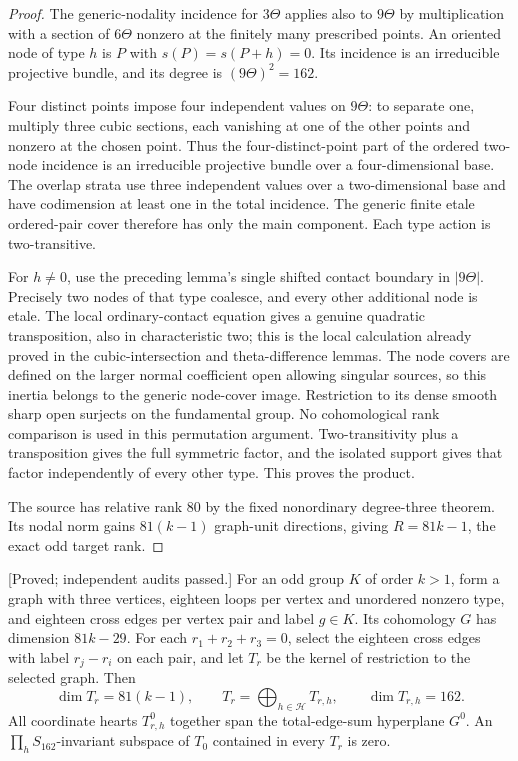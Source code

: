\begin{proof}
The generic-nodality incidence for $3\Theta$ applies also to
$9\Theta$ by multiplication with a section of $6\Theta$ nonzero
at the finitely many prescribed points. An oriented node of type
$h$ is $P$ with $s(P)=s(P+h)=0$. Its incidence is an irreducible
projective bundle, and its degree is $(9\Theta)^2=162$.

Four distinct points impose four independent values on $9\Theta$:
to separate one, multiply three cubic sections, each vanishing
at one of the other points and nonzero at the chosen point.
Thus the four-distinct-point part of the ordered two-node
incidence is an irreducible projective bundle over a four-dimensional
base. The overlap strata use three independent values over a
two-dimensional base and have codimension at least one in the
total incidence. The generic finite etale ordered-pair cover
therefore has only the main component. Each type action is
two-transitive.

For $h\ne0$, use the preceding lemma's single shifted contact
boundary in $|9\Theta|$. Precisely two nodes of that type
coalesce, and every other additional node is etale. The local
ordinary-contact equation gives a genuine quadratic transposition,
also in characteristic two; this is the local calculation already
proved in the cubic-intersection and theta-difference lemmas.
The node covers are defined on the larger normal coefficient
open allowing singular sources, so this inertia belongs to the
generic node-cover image. Restriction to its dense smooth sharp
open surjects on the fundamental group. No cohomological rank
comparison is used in this permutation argument.
Two-transitivity plus a transposition gives the full symmetric
factor, and the isolated support gives that factor independently
of every other type. This proves the product.

The source has relative rank $80$ by the fixed nonordinary
degree-three theorem. Its nodal norm gains $81(k-1)$ graph-unit
directions, giving $R=81k-1$, the exact odd target rank.
\end{proof}

\begin{lemma}
\label{lem:nine-theta-weighted-graph-candidate}
\textup{[Proved; independent audits passed.]}
For an odd group $K$ of order $k>1$, form a graph with three
vertices, eighteen loops per vertex and unordered nonzero type,
and eighteen cross edges per vertex pair and label $g\in K$.
Its cohomology $G$ has dimension $81k-29$. For each
$r_1+r_2+r_3=0$, select the eighteen cross edges with label
$r_j-r_i$ on each pair, and let $T_r$ be the kernel of restriction
to the selected graph. Then
\[
 \dim T_r=81(k-1),\qquad
 T_r=\bigoplus_{h\in\mathcal H}T_{r,h},\qquad
 \dim T_{r,h}=162.                              \tag{N9.2}
\]
All coordinate hearts $T_{r,h}^0$ together span the total-edge-sum
hyperplane $G^0$. An $\prod_hS_{162}$-invariant subspace of $T_0$
contained in every $T_r$ is zero.
\end{lemma}

